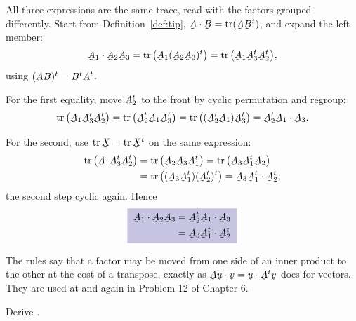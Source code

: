\begin{solution}
All three expressions are the same trace, read with the factors grouped
differently. Start from Definition~\ref{def:tip},
$\bA\cdot\bB=\tr(\bA\bB^{t})$, and expand the left member:
\[
   \bA_{1}\cdot\bA_{2}\bA_{3}=\tr\big(\bA_{1}(\bA_{2}\bA_{3})^{t}\big)
   =\tr\big(\bA_{1}\bA^{t}_{3}\bA^{t}_{2}\big),
\]
using $(\bA\bB)^{t}=\bB^{t}\bA^{t}$.

For the first equality, move $\bA^{t}_{2}$ to the front by cyclic
permutation and regroup:
\[
   \tr\big(\bA_{1}\bA^{t}_{3}\bA^{t}_{2}\big)
   =\tr\big(\bA^{t}_{2}\bA_{1}\bA^{t}_{3}\big)
   =\tr\big((\bA^{t}_{2}\bA_{1})\bA^{t}_{3}\big)
   =\bA^{t}_{2}\bA_{1}\cdot\bA_{3} .
\]

For the second, use $\tr\bX=\tr\bX^{t}$ on the same expression:
\[
\begin{aligned}
   \tr\big(\bA_{1}\bA^{t}_{3}\bA^{t}_{2}\big)
   &=\tr\big(\bA_{2}\bA_{3}\bA^{t}_{1}\big)
   =\tr\big(\bA_{3}\bA^{t}_{1}\bA_{2}\big)\\
   &=\tr\big((\bA_{3}\bA^{t}_{1})(\bA^{t}_{2})^{t}\big)
   =\bA_{3}\bA^{t}_{1}\cdot\bA^{t}_{2} ,
\end{aligned}
\]
the second step cyclic again. Hence
\[
   \boxed{\;
\begin{aligned}
   \bA_{1}\cdot\bA_{2}\bA_{3}
   &=\bA^{t}_{2}\bA_{1}\cdot\bA_{3}\\
   &=\bA_{3}\bA^{t}_{1}\cdot\bA^{t}_{2}
\end{aligned}\;}
\]

The rules say that a factor may be moved from one side of an inner
product to the other at the cost of a transpose, exactly as
$\bA\bu\cdot\bv=\bu\cdot\bA^{t}\bv$ does for vectors. They are used at
 and again in Problem 12 of Chapter 6.
\end{solution}

\begin{problem}
Derive .
\end{problem}

